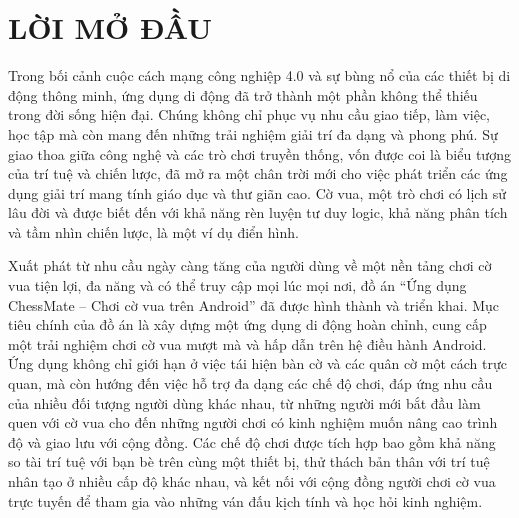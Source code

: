 \documentclass[a4paper,12pt]{article}
\begin{document}
\newpage
\thispagestyle{empty} %

\tableofcontents

\newpage %


\section*{\centering LỜI MỞ ĐẦU} %

\onehalfspacing
\justify
\noindent Trong bối cảnh cuộc cách mạng công nghiệp 4.0 và sự bùng nổ của các thiết bị di động thông minh, ứng dụng di động đã trở thành một phần không thể thiếu trong đời sống hiện đại. Chúng không chỉ phục vụ nhu cầu giao tiếp, làm việc, học tập mà còn mang đến những trải nghiệm giải trí đa dạng và phong phú. Sự giao thoa giữa công nghệ và các trò chơi truyền thống, vốn được coi là biểu tượng của trí tuệ và chiến lược, đã mở ra một chân trời mới cho việc phát triển các ứng dụng giải trí mang tính giáo dục và thư giãn cao. Cờ vua, một trò chơi có lịch sử lâu đời và được biết đến với khả năng rèn luyện tư duy logic, khả năng phân tích và tầm nhìn chiến lược, là một ví dụ điển hình.

\noindent Xuất phát từ nhu cầu ngày càng tăng của người dùng về một nền tảng chơi cờ vua tiện lợi, đa năng và có thể truy cập mọi lúc mọi nơi, đồ án “Ứng dụng ChessMate – Chơi cờ vua trên Android” đã được hình thành và triển khai. Mục tiêu chính của đồ án là xây dựng một ứng dụng di động hoàn chỉnh, cung cấp một trải nghiệm chơi cờ vua mượt mà và hấp dẫn trên hệ điều hành Android. Ứng dụng không chỉ giới hạn ở việc tái hiện bàn cờ và các quân cờ một cách trực quan, mà còn hướng đến việc hỗ trợ đa dạng các chế độ chơi, đáp ứng nhu cầu của nhiều đối tượng người dùng khác nhau, từ những người mới bắt đầu làm quen với cờ vua cho đến những người chơi có kinh nghiệm muốn nâng cao trình độ và giao lưu với cộng đồng. Các chế độ chơi được tích hợp bao gồm khả năng so tài trí tuệ với bạn bè trên cùng một thiết bị, thử thách bản thân với trí tuệ nhân tạo ở nhiều cấp độ khác nhau, và kết nối với cộng đồng người chơi cờ vua trực tuyến để tham gia vào những ván đấu kịch tính và học hỏi kinh nghiệm.
\end{document}
